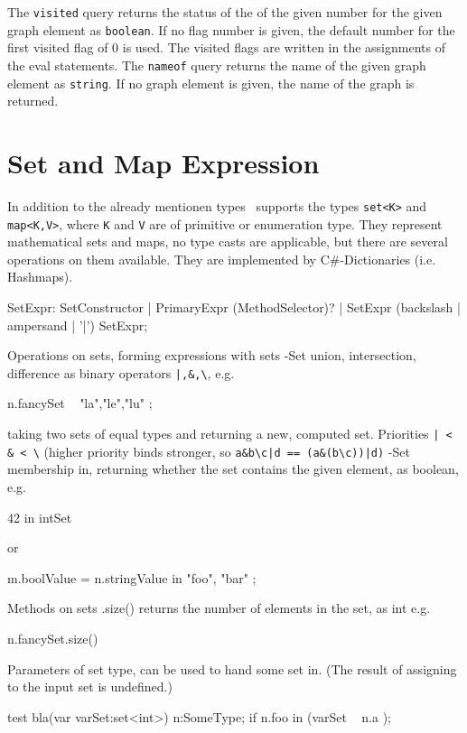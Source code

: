 The \texttt{visited} query returns the status of the  of the given number for the given graph element as \texttt{boolean}.
If no flag number is given, the default number for the first visited flag of 0 is used. The visited flags are written in the assignments of the eval statements.
The \texttt{nameof} query returns the name of the given graph element as \texttt{string}. If no graph element is given, the name of the graph is returned.

\section{Set and Map Expression}

In addition to the already mentionen types \GrG~supports the types \texttt{set<K>} and \texttt{map<K,V>}, where \texttt{K} and \texttt{V} are of primitive or enumeration type.
They represent mathematical sets and maps, no type casts are applicable, but there are several operations on them available. They are implemented by C\#-Dictionaries (i.e. Hashmaps).

\begin{rail} 
  SetExpr: SetConstructor | PrimaryExpr (MethodSelector)? | SetExpr (backslash | ampersand | '|') SetExpr;
\end{rail}

Operations on sets, forming expressions with sets
-Set union, intersection, difference as binary operators \verb#|,&,\#, e.g. 
\begin{grgenlet}
n.fancySet \ { "la","le","lu" };
\end{grgenlet}
taking two sets of equal types and returning a new, computed set.
Priorities \verb#| < & < \# (higher priority binds stronger, so
\verb#a&b\c|d == (a&(b\c))|d)#
-Set membership in, returning whether the set contains the given element, as boolean, e.g. \begin{grgenlet}
42 in intSet
\end{grgenlet}
or
\begin{grgenlet}
m.boolValue = n.stringValue in { "foo", "bar" };
\end{grgenlet}

Methods on sets
.size() returns the number of elements in the set, as int
e.g.
\begin{grgenlet}
n.fancySet.size()
\end{grgenlet}

Parameters of set type, can be used to hand some set in.
(The result of assigning to the input set is undefined.)
\begin{grgen}
test bla(var varSet:set<int>) 
{
	n:SomeType;
	if { n.foo in (varSet \ { n.a }); }
}
\end{grgen}

